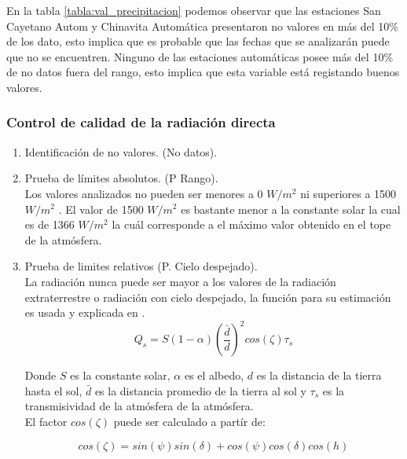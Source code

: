 En la tabla \ref{tabla:val_precipitacion} podemos observar que las estaciones San Cayetano Autom y Chinavita Automática presentaron no valores en más del 10\% de los dato, esto implica que es probable que las fechas que se analizarán puede que no se encuentren. Ninguno de las estaciones automáticas posee más del 10\% de no datos fuera del rango, esto implica que esta variable está registando buenos valores.


\subsubsection{Control de calidad de la radiación directa}

\begin{enumerate}
\item Identificación de no valores. (No datos).\\


\item Prueba de límites absolutos. (P Rango).\\
Los valores analizados no pueden ser menores a 0 $W/m^2$ ni superiores a 1500 $W/m^2$ \citep{estevez2011}. El valor de 1500 $W/m^2$ es bastante menor a la constante solar la cual es de 1366 $W/m^2$ la cuál corresponde a el máximo valor obtenido en el tope de la atmósfera.

\item Prueba de limites relativos (P. Cielo despejado).\\
La radiación nunca puede ser mayor a los valores de la radiación extraterrestre o radiación con cielo despejado, la función para su estimación es usada y explicada en  \citet{Allen1994}.\\

\centering 
\begin{equation}
    Q_s = S(1-\alpha)(\frac{\bar{d}}{d})^2cos(\zeta)\tau_s
\end{equation}

Donde $S$ es la constante solar, $\alpha$ es el albedo, $d$ es la distancia de la tierra hasta el sol, $\bar{d}$ es la distancia promedio de la tierra al sol y $\tau_s$ es la transmisividad de la atmósfera de la atmósfera.\\

El factor $cos(\zeta)$ puede ser calculado a partír de:

\begin{equation}
    cos(\zeta) = sin(\psi)sin(\delta) + cos(\psi)cos(\delta)cos(h)
\end{equation}


\end{enumerate}

